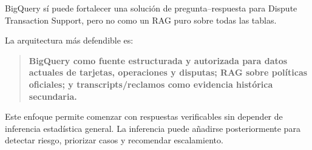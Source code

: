 \documentclass[11pt,a4paper]{article}
\begin{document}
BigQuery sí puede fortalecer una solución de pregunta--respuesta para Dispute Transaction Support, pero no como un RAG puro sobre todas las tablas.

La arquitectura más defendible es:

\begin{quote}
\textbf{BigQuery como fuente estructurada y autorizada para datos actuales de tarjetas, operaciones y disputas; RAG sobre políticas oficiales; y transcripts/reclamos como evidencia histórica secundaria.}
\end{quote}

Este enfoque permite comenzar con respuestas verificables sin depender de inferencia estadística general. La inferencia puede añadirse posteriormente para detectar riesgo, priorizar casos y recomendar escalamiento.
\end{document}
